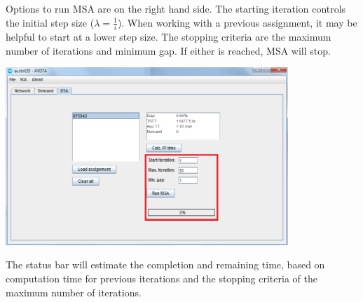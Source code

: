 Options to run MSA are on the right hand side. The starting iteration controls the initial step size ($\lambda=\frac{1}{i}$). When working with a previous assignment, it may be helpful to start at a lower step size. The stopping criteria are the maximum number of iterations and minimum gap. If either is reached, MSA will stop.
\begin{center}
\includegraphics[width=0.8\textwidth]{images/msa1.png}
\end{center}
The status bar will estimate the completion and remaining time, based on computation time for previous iterations and the stopping criteria of the maximum number of iterations.